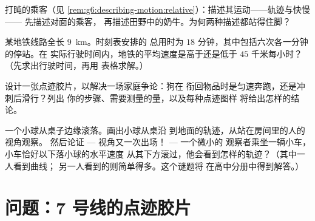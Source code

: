 \begin{exercise}[$\star\star$]\label{exo:g6:describing-motion:9}
打盹的乘客（见
\cref{rem:g6:describing-motion:relative}）：描述其运动——轨迹与快慢——
先描述对面的乘客，
再描述田野中的奶牛。为何两种描述都站得住脚？
\end{exercise}

\begin{exercise}[$\star\star$]\label{exo:g6:describing-motion:10}
某地铁线路全长 \qty{9}{km}。时刻表安排的
总用时为 $18$ 分钟，其中包括六次各一分钟的停站。在
实际行驶时间内，地铁的平均速度是高于还是低于
$45$ 千米每小时？（先求出行驶时间，再用
表格求解。）
\end{exercise}

\begin{exercise}[$\star\star$]\label{exo:g6:describing-motion:11}
设计一张点迹胶片，以解决一场家庭争论：狗在
衔回物品时是匀速奔跑，还是冲刺后滑行？列出
你的步骤、需要测量的量，以及每种点迹图样
将给出怎样的结论。
\end{exercise}

\begin{exercise}[$\star\star\star$]\label{exo:g6:describing-motion:12}
一个小球从桌子边缘滚落。画出小球从桌沿
到地面的轨迹，从站在房间里的人的视角观察。
然后论证 --- 视角又一次出场！ --- 一个微小的
观察者乘坐一辆小车，小车恰好以下落小球的水平速度
从其下方滚过，他会看到怎样的轨迹？（其中一人看到曲线；
另一人看到的则简单得多。这个谜题将
在高中分册中得到解答。）
\end{exercise}

\section{问题：7 号线的点迹胶片}


